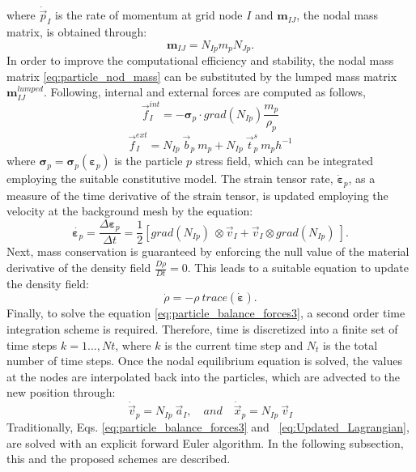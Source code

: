\documentclass[preprint,12pt,a4paper]{elsarticle}
\newcommand{\tens}[1]{
  \ensuremath{\mathbf{{#1}}}
}
\newcommand\Grad[1]{grad({#1})}
\begin{document}
where $\dot{\vec{p}}_{I}$ is the rate of momentum at grid node $I$ and $\tens{m}_{IJ}$, the nodal mass matrix, is obtained through:
\begin{equation}
  \label{eq:particle_nod_mass}
  \tens{m}_{IJ} = N_{Ip} m_p N_{Jp}.
\end{equation}
In order to improve the computational efficiency and stability, the nodal mass matrix
\eqref{eq:particle_nod_mass} can be substituted by the lumped mass
matrix $\tens{m}_{IJ}^{lumped}$.
Following, internal and external forces are computed as follows,
\begin{equation}
  \label{eq:nodal_internal_forces}
  \vec{f}_{I}^{int} = - \tens{\sigma}_{p} \cdot \Grad{N_{Ip}} \frac{m_p}{\rho_p}
\end{equation}
\begin{equation}
  \label{eq:nodal_external_forces}
  \vec{f}_{I}^{ext} = N_{Ip}\ \vec{b}_{p}\ m_p  + N_{Ip}\ \vec{t}^s_{p}\ m_p h^{-1} 
\end{equation}
where $\tens{\sigma}_{p} = \tens{\sigma}_{p}(\tens{\varepsilon}_{p})$
is the particle $p$ stress field, which can be integrated employing
the suitable constitutive model. The strain tensor rate, $\dot{ \tens{\varepsilon}}_{p}$, as a measure of the time derivative of the strain tensor, is updated employing the velocity at the background mesh by the equation:
\begin{equation}
  \label{eq:IncrStrainPoint}
  \dot{\tens{\varepsilon}_{p}} = \frac{\Delta
    \tens{\varepsilon}_{p}}{\Delta t} =
  \frac{1}{2} \left[\Grad{N_{Ip}}\ \otimes \vec{v}_{I} + \vec{v}_{I} \otimes
    \Grad{N_{Ip}}\ \right].
\end{equation}
Next, mass conservation is guaranteed by enforcing the null value of
the material derivative of the density field $\frac{D \rho}{D t} = 0$.
This leads to a suitable equation to update the density field:
\begin{equation}
  \label{eq:MassConservation}
\dot{\rho} = - \rho\ \mathit{trace} \left( \dot{\tens{\varepsilon}} \right).
\end{equation}
Finally, to solve the equation \eqref{eq:particle_balance_forces3}, a second order time integration scheme is required. Therefore, time is
discretized into a finite set of time steps $k = 1\ldots ,Nt$, where $k$ is the current time step and $N_t$
is the total number of time steps. Once the nodal equilibrium equation is solved, the values at the nodes are
interpolated back into the particles, which are advected
to the new position through:
\begin{equation}
  \label{eq:Updated_Lagrangian}
  \dot{\vec{v}}_p = N_{Ip}\ \vec{a}_{I},\quad and\quad
  \dot{\vec{x}}_{p} = N_{Ip}\ \vec{v}_{I}  
\end{equation}
Traditionally, Eqs.
\eqref{eq:particle_balance_forces3} and ~\eqref{eq:Updated_Lagrangian},
are solved with an explicit forward Euler algorithm. In the following subsection, this and the proposed schemes are described.
\end{document}
